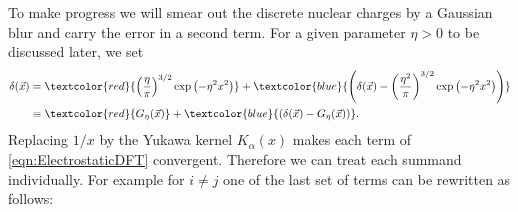 \documentclass{MFHarticle}
\begin{document}
\newcommand{\tlr}[1]{\textcolor{red}{#1}}
\newcommand{\tsr}[1]{\textcolor{blue}{#1}}
To make progress we will smear out the discrete nuclear charges
by a Gaussian blur and carry the error in a second term.
For a given parameter $\eta > 0$ to be discussed later, we set
\begin{align}
	\label{eqn:TermSplitup}
	\nonumber
	\delta(\vec{x}) &=
	\tlr{\left( \frac{\eta}{\pi} \right)^{3/2} \exp\left( -\eta^2 x^2 \right)}
		+ \tsr{\left(
		\delta(\vec{x}) -
	\left( \frac{\eta^2}{\pi} \right)^{3/2} \exp\left( -\eta^2 x^2 \right)
	\right)} \\
	&\equiv
	\tlr{G_\eta(\vec{x})}
	+ \tsr{\left( \delta(\vec{x}) - G_\eta(\vec{x}) \right)}.
\end{align}
Replacing $1/x$ by the Yukawa kernel $K_\alpha(x)$
makes each term of \eqref{eqn:ElectrostaticDFT} convergent.
Therefore we can treat each summand individually.
For example for $i\neq j$ one of the last set of terms
can be rewritten as follows:


\end{document}

